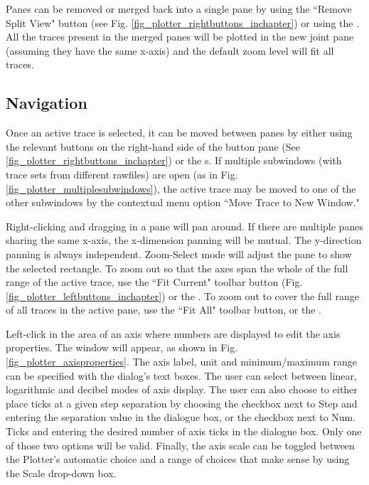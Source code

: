  Panes can be removed or merged back into a single pane by using the ``Remove Split View" button (see Fig. \ref{fig_plotter_rightbuttons_inchapter}) or using the .  All the traces present in the merged panes will be plotted in the new joint pane (assuming they have the same x-axis) and the default zoom level will fit all traces.


\subsection{Navigation}
\label{subsec_pane_navigation}

 Once an active trace is selected, it can be moved between panes by either using the relevant buttons on the right-hand side of the button pane (See \ref{fig_plotter_rightbuttons_inchapter}) or the s. If multiple subwindows (with trace sets from different rawfiles) are open (as in Fig. \ref{fig_plotter_multiplesubwindows}), the active trace may be moved to one of the other subwindows by the contextual menu option ``\textsf{Move Trace to New Window}."

\newpage

 Right-clicking and dragging in a pane will pan around.  If there are multiple panes sharing the same x-axis, the x-dimension panning will be mutual. The y-direction panning is always independent. Zoom-Select mode will adjust the pane to show the selected rectangle. To zoom out so that the axes span the whole of the full range of the active trace, use the ``Fit Current" toolbar button (Fig. \ref{fig_plotter_leftbuttons_inchapter}) or the .  To zoom out to cover the full range of all traces in the active pane, use the ``Fit All" toolbar button, or the .

 Left-click in the area of an axis where numbers are displayed to edit the axis properties. The  window will appear, as shown in Fig. \ref{fig_plotter_axisproperties}. The axis label, unit and minimum/maximum range can be specified with the dialog's text boxes. The user can select between linear, logarithmic and decibel modes of axis display. The user can also choose to either place ticks at a given step separation by choosing the checkbox next to \textsf{Step} and entering the separation value in the dialogue box, or the checkbox next to \textsf{Num. Ticks} and entering the desired number of axis ticks in the dialogue box.  Only one of those two options will be valid.  Finally, the axis scale can be toggled between the Plotter's automatic choice and a range of choices that make sense by using the \textsf{Scale} drop-down box.


